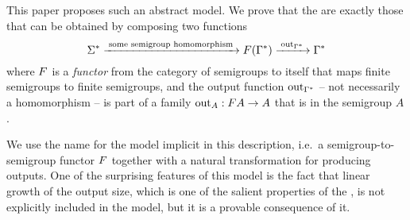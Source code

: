 This paper proposes such an abstract model.  We prove that the  are exactly those that can be obtained by composing two functions
\[ \Sigma^* 
  \xrightarrow{\;\text{some semigroup homomorphism}\;}
    \functor(\Gamma^*)
    \xrightarrow{\;\outfun_{\Gamma^*}\;}
    \Gamma^*
\]
where $\functor$ is a \emph{functor} from the category of semigroups to itself that
maps finite semigroups to finite semigroups, and the output function
$\mathrm{out}_{\Gamma^*}$ -- not necessarily a homomorphism -- is part of a family
$\outfun_A : \functor A \to A$ that is  in the semigroup $A$.

We use the name  for the model implicit in this description, i.e.~a semigroup-to-semigroup functor $\functor$ together with a natural transformation for producing outputs.  One of the surprising features of this model is the fact that linear growth of the output size, which is one of the salient properties of the , is not explicitly included in the model, but it is a provable consequence of it. 



